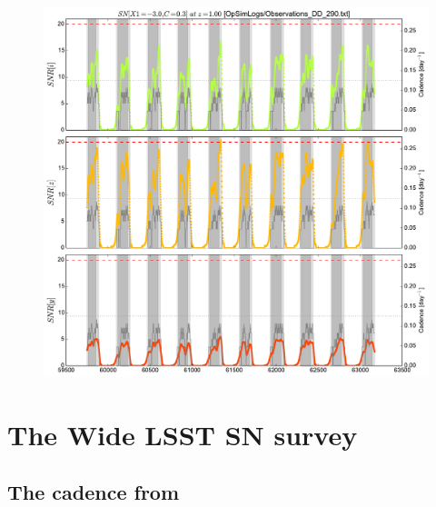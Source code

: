 \documentclass[\docopts]{\docclass}
\begin{document}
\begin{figure}[t]
  \begin{center}
    \includegraphics[width=\linewidth]{metric_DD_290.pdf}
    \caption{}
  \end{center}
\end{figure}




\section{The Wide LSST SN survey}
\subsection{The cadence from }
\label{sec:results}
\end{document}
